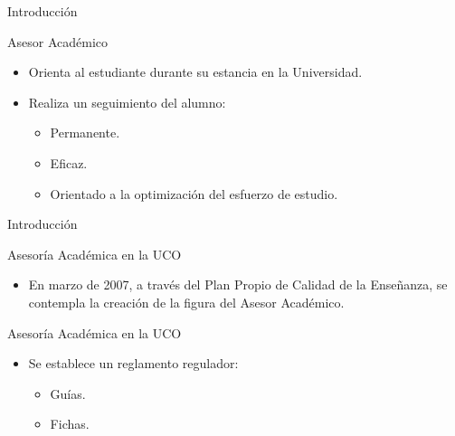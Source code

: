 \documentclass[10pt, hyperref={pdfpagelabels=false}]{beamer}
\begin{document}
      \begin{frame}{Introducción}
        \begin{block}{Asesor Académico}
          \begin{itemize}
           \item Orienta al estudiante durante su estancia en la Universidad.
           \item Realiza un seguimiento del alumno:
           \begin{itemize}
            \item Permanente.
            \item Eficaz.
            \item Orientado a la optimización del esfuerzo de estudio.
           \end{itemize}
          \end{itemize}
        \end{block}
      \end{frame}

      \begin{frame}{Introducción}
        \begin{block}{Asesoría Académica en la UCO}
          \begin{itemize}
           \item En marzo de 2007, a través del Plan Propio de Calidad de la
                 Enseñanza, se contempla la creación de la figura del Asesor
                 Académico.
          \end{itemize}
        \end{block}
        \begin{block}{Asesoría Académica en la UCO}
          \begin{itemize}
           \item Se establece un reglamento regulador:
           \begin{itemize}
            \item Guías.
            \item Fichas.
           \end{itemize}
          \end{itemize}
        \end{block}
      \end{frame}
\end{document}

